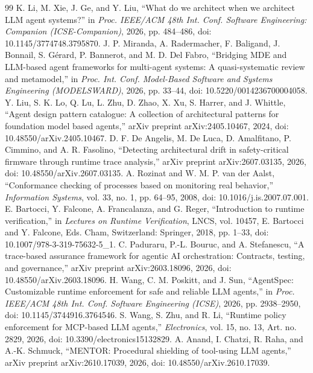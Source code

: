 \begin{thebibliography}{99}
 K. Li, M. Xie, J. Ge, and Y. Liu, ``What do we architect when we architect LLM agent systems?'' in \emph{Proc. IEEE/ACM 48th Int. Conf. Software Engineering: Companion (ICSE-Companion)}, 2026, pp. 484--486, doi: 10.1145/3774748.3795870.
 J. P. Miranda, A. Radermacher, F. Baligand, J. Bonnail, S. Gérard, P. Bannerot, and M. D. Del Fabro, ``Bridging MDE and LLM-based agent frameworks for multi-agent systems: A quasi-systematic review and metamodel,'' in \emph{Proc. Int. Conf. Model-Based Software and Systems Engineering (MODELSWARD)}, 2026, pp. 33--44, doi: 10.5220/0014236700004058.
 Y. Liu, S. K. Lo, Q. Lu, L. Zhu, D. Zhao, X. Xu, S. Harrer, and J. Whittle, ``Agent design pattern catalogue: A collection of architectural patterns for foundation model based agents,'' arXiv preprint arXiv:2405.10467, 2024, doi: 10.48550/arXiv.2405.10467.
 D. F. De Angelis, M. De Luca, D. Amalfitano, P. Cimmino, and A. R. Fasolino, ``Detecting architectural drift in safety-critical firmware through runtime trace analysis,'' arXiv preprint arXiv:2607.03135, 2026, doi: 10.48550/arXiv.2607.03135.
 A. Rozinat and W. M. P. van der Aalst, ``Conformance checking of processes based on monitoring real behavior,'' \emph{Information Systems}, vol. 33, no. 1, pp. 64--95, 2008, doi: 10.1016/j.is.2007.07.001.
 E. Bartocci, Y. Falcone, A. Francalanza, and G. Reger, ``Introduction to runtime verification,'' in \emph{Lectures on Runtime Verification}, LNCS, vol. 10457, E. Bartocci and Y. Falcone, Eds. Cham, Switzerland: Springer, 2018, pp. 1--33, doi: 10.1007/978-3-319-75632-5\_1.
 C. Paduraru, P.-L. Bouruc, and A. Stefanescu, ``A trace-based assurance framework for agentic AI orchestration: Contracts, testing, and governance,'' arXiv preprint arXiv:2603.18096, 2026, doi: 10.48550/arXiv.2603.18096.
 H. Wang, C. M. Poskitt, and J. Sun, ``AgentSpec: Customizable runtime enforcement for safe and reliable LLM agents,'' in \emph{Proc. IEEE/ACM 48th Int. Conf. Software Engineering (ICSE)}, 2026, pp. 2938--2950, doi: 10.1145/3744916.3764546.
 S. Wang, S. Zhu, and R. Li, ``Runtime policy enforcement for MCP-based LLM agents,'' \emph{Electronics}, vol. 15, no. 13, Art. no. 2829, 2026, doi: 10.3390/electronics15132829.
 A. Anand, I. Chatzi, R. Raha, and A.-K. Schmuck, ``MENTOR: Procedural shielding of tool-using LLM agents,'' arXiv preprint arXiv:2610.17039, 2026, doi: 10.48550/arXiv.2610.17039.

\end{thebibliography}
